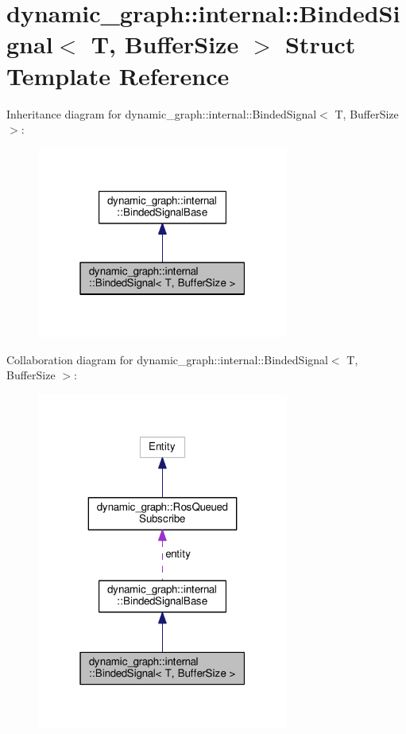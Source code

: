 \hypertarget{structdynamic__graph_1_1internal_1_1BindedSignal}{}\section{dynamic\+\_\+graph\+:\+:internal\+:\+:Binded\+Signal$<$ T, Buffer\+Size $>$ Struct Template Reference}
\label{structdynamic__graph_1_1internal_1_1BindedSignal}


Inheritance diagram for dynamic\+\_\+graph\+:\+:internal\+:\+:Binded\+Signal$<$ T, Buffer\+Size $>$\+:\nopagebreak
\begin{figure}[H]
\begin{center}
\leavevmode
\includegraphics[width=235pt]{structdynamic__graph_1_1internal_1_1BindedSignal__inherit__graph}
\end{center}
\end{figure}


Collaboration diagram for dynamic\+\_\+graph\+:\+:internal\+:\+:Binded\+Signal$<$ T, Buffer\+Size $>$\+:\nopagebreak
\begin{figure}[H]
\begin{center}
\leavevmode
\includegraphics[width=235pt]{structdynamic__graph_1_1internal_1_1BindedSignal__coll__graph}
\end{center}
\end{figure}
